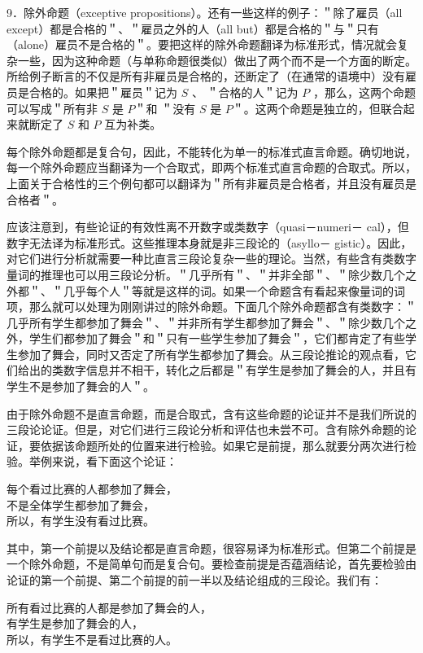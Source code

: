 9．除外命题（exceptive propositions）。还有一些这样的例子：＂除了雇员（all except）都是合格的＂、＂雇员之外的人（all but）都是合格的＂与＂只有（alone）雇员不是合格的＂。要把这样的除外命题翻译为标准形式，情况就会复杂一些，因为这种命题（与单称命题很类似）做出了两个而不是一个方面的断定。所给例子断言的不仅是所有非雇员是合格的，还断定了（在通常的语境中）没有雇员是合格的。如果把＂雇员＂记为 $S$ 、 ＂合格的人＂记为 $P$ ，那么，这两个命题可以写成＂所有非 $S$ 是 $P$＂和 ＂没有 $S$ 是 $P$＂。这两个命题是独立的，但联合起来就断定了 $S$ 和 $P$ 互为补类。

每个除外命题都是复合句，因此，不能转化为单一的标准式直言命题。确切地说，每一个除外命题应当翻译为一个合取式，即两个标准式直言命题的合取式。所以，上面关于合格性的三个例句都可以翻译为＂所有非雇员是合格者，并且没有雇员是合格者＂。

应该注意到，有些论证的有效性离不开数字或类数字（quasi－numeri－ cal），但数字无法译为标准形式。这些推理本身就是非三段论的（asyllo－ gistic）。因此，对它们进行分析就需要一种比直言三段论复杂一些的理论。当然，有些含有类数字量词的推理也可以用三段论分析。＂几乎所有＂、＂并非全部＂、＂除少数几个之外都＂、＂几乎每个人＂等就是这样的词。如果一个命题含有看起来像量词的词项，那么就可以处理为刚刚讲过的除外命题。下面几个除外命题都含有类数字：＂几乎所有学生都参加了舞会＂、＂并非所有学生都参加了舞会＂、＂除少数几个之外，学生们都参加了舞会＂和＂只有一些学生参加了舞会＂，它们都肯定了有些学生参加了舞会，同时又否定了所有学生都参加了舞会。从三段论推论的观点看，它们给出的类数字信息并不相干，转化之后都是＂有学生是参加了舞会的人，并且有学生不是参加了舞会的人＂。

由于除外命题不是直言命题，而是合取式，含有这些命题的论证并不是我们所说的三段论论证。但是，对它们进行三段论分析和评估也未尝不可。含有除外命题的论证，要依据该命题所处的位置来进行检验。如果它是前提，那么就要分两次进行检验。举例来说，看下面这个论证：

\begin{displayquote}
每个看过比赛的人都参加了舞会，\\
不是全体学生都参加了舞会，\\
所以，有学生没有看过比赛。
\end{displayquote}

其中，第一个前提以及结论都是直言命题，很容易译为标准形式。但第二个前提是一个除外命题，不是简单句而是复合句。要检查前提是否蕴涵结论，首先要检验由论证的第一个前提、第二个前提的前一半以及结论组成的三段论。我们有：

\begin{displayquote}
所有看过比赛的人都是参加了舞会的人，\\
有学生是参加了舞会的人，\\
所以，有学生不是看过比赛的人。
\end{displayquote}

